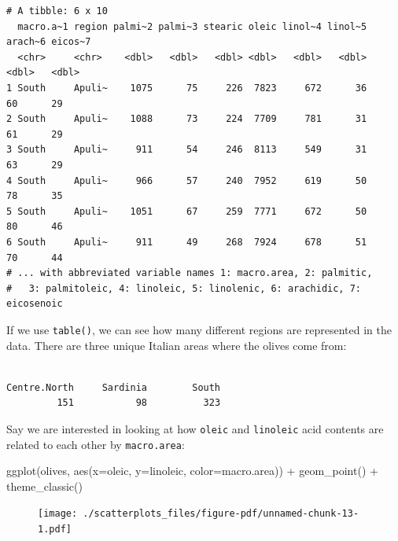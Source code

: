 \documentclass[
  letterpaper,
  DIV=11,
  numbers=noendperiod]{scrreprt}
\newenvironment{Shaded}{\begin{snugshade}}{\end{snugshade}}
\newcommand{\AttributeTok}[1]{\textcolor[rgb]{0.40,0.45,0.13}{#1}}
\newcommand{\FunctionTok}[1]{\textcolor[rgb]{0.28,0.35,0.67}{#1}}
\newcommand{\NormalTok}[1]{\textcolor[rgb]{0.00,0.23,0.31}{#1}}
\newcommand{\SpecialCharTok}[1]{\textcolor[rgb]{0.37,0.37,0.37}{#1}}
\begin{document}
\begin{verbatim}
# A tibble: 6 x 10
  macro.a~1 region palmi~2 palmi~3 stearic oleic linol~4 linol~5 arach~6 eicos~7
  <chr>     <chr>    <dbl>   <dbl>   <dbl> <dbl>   <dbl>   <dbl>   <dbl>   <dbl>
1 South     Apuli~    1075      75     226  7823     672      36      60      29
2 South     Apuli~    1088      73     224  7709     781      31      61      29
3 South     Apuli~     911      54     246  8113     549      31      63      29
4 South     Apuli~     966      57     240  7952     619      50      78      35
5 South     Apuli~    1051      67     259  7771     672      50      80      46
6 South     Apuli~     911      49     268  7924     678      51      70      44
# ... with abbreviated variable names 1: macro.area, 2: palmitic,
#   3: palmitoleic, 4: linoleic, 5: linolenic, 6: arachidic, 7: eicosenoic
\end{verbatim}

If we use \texttt{table()}, we can see how many different regions are
represented in the data. There are three unique Italian areas where the
olives come from:

\begin{Shaded}
\end{Shaded}

\begin{verbatim}

Centre.North     Sardinia        South 
         151           98          323 
\end{verbatim}

Say we are interested in looking at how \texttt{oleic} and
\texttt{linoleic} acid contents are related to each other by
\texttt{macro.area}:

\begin{Shaded}
\begin{Highlighting}[]
\FunctionTok{ggplot}\NormalTok{(olives, }\FunctionTok{aes}\NormalTok{(}\AttributeTok{x=}\NormalTok{oleic, }\AttributeTok{y=}\NormalTok{linoleic, }\AttributeTok{color=}\NormalTok{macro.area)) }\SpecialCharTok{+}
  \FunctionTok{geom\_point}\NormalTok{() }\SpecialCharTok{+}
  \FunctionTok{theme\_classic}\NormalTok{()}
\end{Highlighting}
\end{Shaded}

\begin{figure}[H]

{\centering \texttt{[image: ./scatterplots\_files/figure-pdf/unnamed-chunk-13-1.pdf]}

}

\end{figure}
\end{document}
